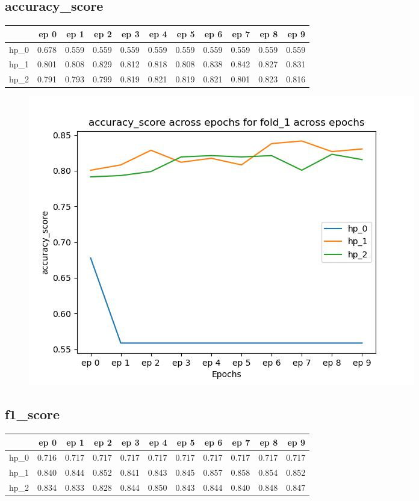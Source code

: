 \documentclass{article}
\begin{document}
\subsection{accuracy\_score}
\begin{tabular}{lrrrrrrrrrr}
\toprule
{} &   ep 0 &   ep 1 &   ep 2 &   ep 3 &   ep 4 &   ep 5 &   ep 6 &   ep 7 &   ep 8 &   ep 9 \\
\midrule
hp\_0 &  0.678 &  0.559 &  0.559 &  0.559 &  0.559 &  0.559 &  0.559 &  0.559 &  0.559 &  0.559 \\
hp\_1 &  0.801 &  0.808 &  0.829 &  0.812 &  0.818 &  0.808 &  0.838 &  0.842 &  0.827 &  0.831 \\
hp\_2 &  0.791 &  0.793 &  0.799 &  0.819 &  0.821 &  0.819 &  0.821 &  0.801 &  0.823 &  0.816 \\
\bottomrule
\end{tabular}

\begin{figure}[H]
\includegraphics[scale = 0.75]{fold_1/accuracy_score}
\end{figure}
\subsection{f1\_score}
\begin{tabular}{lrrrrrrrrrr}
\toprule
{} &   ep 0 &   ep 1 &   ep 2 &   ep 3 &   ep 4 &   ep 5 &   ep 6 &   ep 7 &   ep 8 &   ep 9 \\
\midrule
hp\_0 &  0.716 &  0.717 &  0.717 &  0.717 &  0.717 &  0.717 &  0.717 &  0.717 &  0.717 &  0.717 \\
hp\_1 &  0.840 &  0.844 &  0.852 &  0.841 &  0.843 &  0.845 &  0.857 &  0.858 &  0.854 &  0.852 \\
hp\_2 &  0.834 &  0.833 &  0.828 &  0.844 &  0.850 &  0.843 &  0.844 &  0.840 &  0.848 &  0.847 \\
\bottomrule
\end{tabular}
\end{document}
